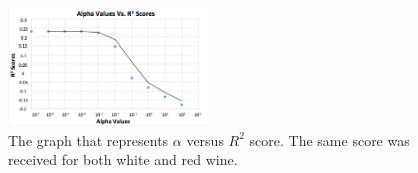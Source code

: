 \begin{figure}[htb]



  \centering  %

  \includegraphics[width=0.47\textwidth]{figs/R2ridge.png}

  \caption{The graph that represents $\alpha$ versus $R^2$ score. The same
  score was received for both white and red wine.}

  \label{fig:R2ridge}

\end{figure}


